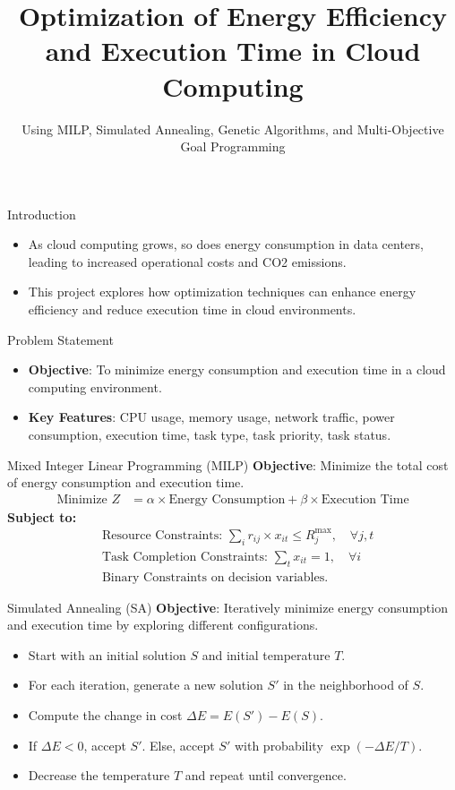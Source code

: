 \documentclass{beamer}
\title{Optimization of Energy Efficiency and Execution Time in Cloud Computing}
\subtitle{Using MILP, Simulated Annealing, Genetic Algorithms, and Multi-Objective Goal Programming}
\author{}
\date{}
\begin{document}
\frame{\titlepage}

\begin{frame}{Introduction}
    \begin{itemize}
        \item As cloud computing grows, so does energy consumption in data centers, leading to increased operational costs and CO2 emissions.
        \item This project explores how optimization techniques can enhance energy efficiency and reduce execution time in cloud environments.
    \end{itemize}
\end{frame}

\begin{frame}{Problem Statement}
    \begin{itemize}
        \item \textbf{Objective}: To minimize energy consumption and execution time in a cloud computing environment.
        \item \textbf{Key Features}: CPU usage, memory usage, network traffic, power consumption, execution time, task type, task priority, task status.
    \end{itemize}
\end{frame}

\begin{frame}{Mixed Integer Linear Programming (MILP)}
    \textbf{Objective}: Minimize the total cost of energy consumption and execution time.
    \begin{align*}
        \text{Minimize } Z &= \alpha \times \text{Energy Consumption} + \beta \times \text{Execution Time}
    \end{align*}
    \textbf{Subject to:}
    \begin{align*}
        &\text{Resource Constraints: } \sum_{i} r_{ij} \times x_{it} \leq R_j^{\text{max}}, \quad \forall j, t \\
        &\text{Task Completion Constraints: } \sum_{t} x_{it} = 1, \quad \forall i \\
        &\text{Binary Constraints on decision variables.}
    \end{align*}
\end{frame}

\begin{frame}{Simulated Annealing (SA)}
    \textbf{Objective}: Iteratively minimize energy consumption and execution time by exploring different configurations.
    \begin{itemize}
        \item Start with an initial solution \(S\) and initial temperature \(T\).
        \item For each iteration, generate a new solution \(S'\) in the neighborhood of \(S\).
        \item Compute the change in cost \(\Delta E = E(S') - E(S)\).
        \item If \(\Delta E < 0\), accept \(S'\). Else, accept \(S'\) with probability \(\exp(-\Delta E / T)\).
        \item Decrease the temperature \(T\) and repeat until convergence.
    \end{itemize}
\end{frame}
\end{document}
